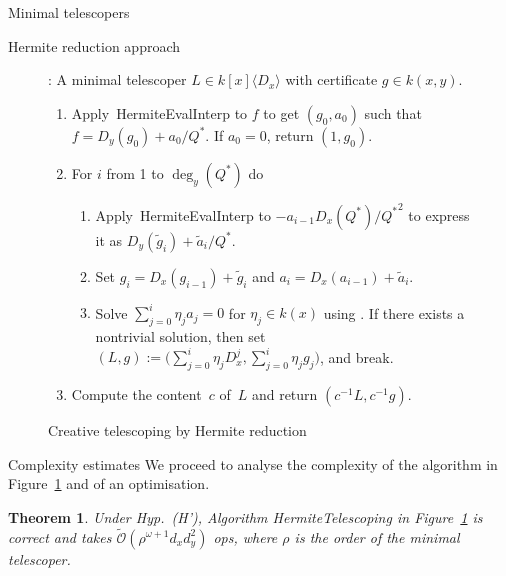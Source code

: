 \documentclass{sig-alt-full}
\newcommand{\bigOsoft}{\tilde{\mathcal{O}}}
\newtheorem{theorem}[lemma]{Theorem}
\begin{document}
\begin{section}{Minimal telescopers}
\begin{subsection}{Hermite reduction approach}
\begin{figure}
{\begin{minipage}{8.1cm}
{\noindent {}:
A minimal telescoper $L\in k[x]\langle D_x \rangle$ with certificate $g\in k(x, y)$.
\begin{enumerate}
\item Apply~\textsf{HermiteEvalInterp} to $f$ to get $(g_0, a_0)$ such that $f = D_y(g_0) + a_0/Q^*$.
If $a_0=0$, return $(1, g_0)$.
\item For $i$ from 1 to $\deg_y(Q^*)$ do
\begin{enumerate}
\item Apply~\textsf{HermiteEvalInterp} to $-a_{i-1}D_x(Q^*)/{Q^*}^2$
  to express it as $D_y(\tilde{g}_{i})+ \tilde{a}_{i}/Q^*$.
\item Set $g_i = D_x(g_{i-1}) + \tilde{g}_i$ and $a_i = D_x(a_{i-1}) + \tilde{a}_i$.
\item Solve $\sum_{j=0}^i \eta_j a_j =0$ for $\eta_j\in k(x)$
  using \cite{Storjohann2005}.
If there exists a
nontrivial solution, then set $(L,g) := \bigl(\sum_{j=0}^i \eta_j D_x^j,
\sum_{j=0}^i \eta_jg_j\bigr)$, and break.
\end{enumerate}
\item Compute the content~$c$ of~$L$ and return
$(c^{-1}L, c^{-1}g)$.
\end{enumerate}}
\end{minipage}}
\caption{Creative telescoping by Hermite reduction}
\label{fig:HRTelescoping}
\vskip-10pt
\end{figure}

\begin{subsubsection}{Complexity estimates}\label{sec:compl-estim}
We proceed to analyse the complexity of the algorithm in
Figure~\ref{fig:HRTelescoping} and of an optimisation.

\begin{theorem}
Under Hyp.~(H'), Algorithm
\textsf{HermiteTelescoping} in Figure~\ref{fig:HRTelescoping} is correct
and takes $\bigOsoft(\rho^{\omega+1}d_x d_y^2)$ ops,
where $\rho$ is the order of the minimal telescoper.
\end{theorem}


\end{subsubsection}
\end{subsection}
\end{section}
\end{document}

